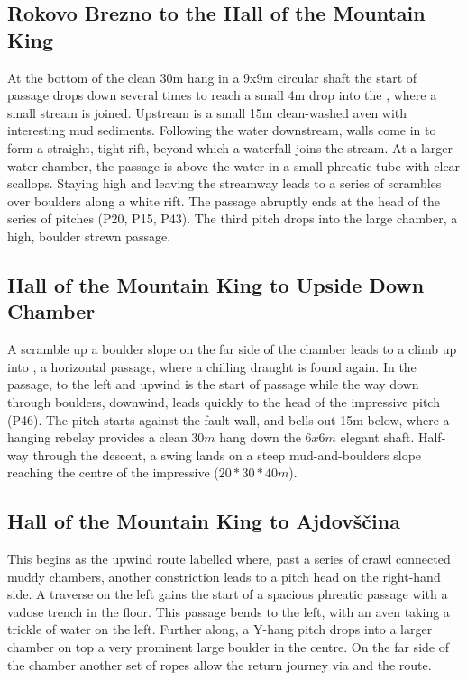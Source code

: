 \subsection{Rokovo Brezno to the Hall of the Mountain King}
 At the bottom of the clean 30m hang in a 9x9m circular shaft the start of  passage drops down several times to reach a small 4m drop into the , where a small stream is joined. Upstream is a small 15m clean-washed aven with interesting mud sediments. Following the water downstream, walls come in to form a straight, tight rift, beyond which a waterfall joins the stream. At a larger water chamber, the passage is above the water in a small phreatic tube with clear scallops. Staying high and leaving the streamway leads to a series of scrambles over boulders along a white rift. The passage abruptly ends at the head of the  series of pitches (P20, P15, P43). The third pitch drops into the large  chamber, a high, boulder strewn passage.

\subsection{Hall of the Mountain King to Upside Down Chamber}
A scramble up a boulder slope on the far side of the chamber leads to a climb up into , a horizontal passage, where a chilling draught is found again. In the passage, to the left and upwind is the start of  passage while the way down through boulders, downwind, leads quickly to the head of the impressive  pitch (P46). The pitch starts against the fault wall, and bells out 15m below, where a hanging rebelay provides a clean $30m$ hang down the $6x6m$ elegant shaft. Half-way through the descent, a swing lands on a steep mud-and-boulders slope reaching the centre of the impressive  ($20*30*40m$).

\subsection{Hall of the Mountain King to Ajdov\v{s}\v{c}ina}
This begins as the upwind route labelled  where, past a series of crawl connected muddy chambers, another constriction leads to a pitch head on the right-hand side. A traverse on the left gains the start of  a spacious phreatic passage with a vadose trench in the floor. This passage bends to the left, with an aven taking a trickle of water on the left. Further along, a Y-hang pitch drops into a larger chamber on top a very prominent large boulder in the centre. On the far side of the chamber another set of ropes allow the return journey via  and the  route.

